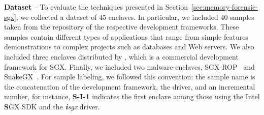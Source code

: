 \vspace{0.2cm}
\noindent \textbf{Dataset} -- 
To evaluate the techniques presented in Section~\ref{sec:memory-forensic-sgx},
we collected a dataset of $45$ enclaves.
In particular, we included $40$ samples taken from the repository of the 
respective
development frameworks.
These samples contain different types of applications that range from simple
features demonstrations to complex projects such as databases and Web servers.
We also included three enclaves distributed by \cite{conclave}, which 
is a commercial development framework for SGX.
Finally, we included two malware-enclaves, SGX-ROP~\citep{sgxrop} and
SnakeGX~\citep{snakegx}.
For sample labeling, we followed this convention: the sample name is the
concatenation of the development framework, the driver, and an incremental
number, for instance, \textbf{S-I-1} indicates the first enclave among those 
using the Intel \textbf{S}GX SDK
and the \emph{\textbf{i}sgx} driver. 

\newcommand*\rot[1]{\hbox to1em{\hss\rotatebox[origin=br]{-90}{#1}}}
\def\arraystretch{0.80}

